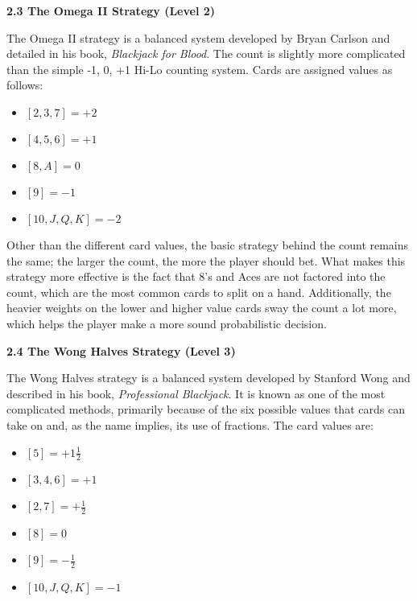 \documentclass[12pt]{article}
\begin{document}
    \textbf{2.3 The Omega II Strategy (Level 2)} \newline 
    
    The Omega II strategy is a balanced system developed by Bryan Carlson and detailed in his book, \textit{Blackjack for Blood}. The count is slightly more complicated than the simple -1, 0, +1 Hi-Lo counting system. Cards are assigned values as follows: 
	
    \begin{itemize}
    	\item $[2, 3, 7] = +2$
        \item $[4, 5, 6] = +1$
        \item $[8, A] = 0$
        \item $[9] = -1$
        \item $[10, J, Q, K] = -2$
    \end{itemize} 
    
    Other than the different card values, the basic strategy behind the count remains the same; the larger the count, the more the player should bet. What makes this strategy more effective is the fact that 8’s and Aces are not factored into the count, which are the most common cards to split on a hand. Additionally, the heavier weights on the lower and higher value cards sway the count a lot more, which helps the player make a more sound probabilistic decision. \newline
    
    \textbf{2.4 The Wong Halves Strategy (Level 3)} \newline
    
    The Wong Halves strategy is a balanced system developed by Stanford Wong and described in his book, \textit{Professional Blackjack}. It is known as one of the most complicated methods, primarily because of the six possible values that cards can take on and, as the name implies, its use of fractions. The card values are:
    
	\begin{itemize}
    	\item $[5] = +1 \frac{1}{2}$
        \item $[3, 4, 6] = +1$
        \item $[2, 7] = +\frac{1}{2}$
        \item $[8] = 0$
        \item $[9] = -\frac{1}{2}$
        \item $[10, J, Q, K] = -1$
    \end{itemize}
    
\end{document}
